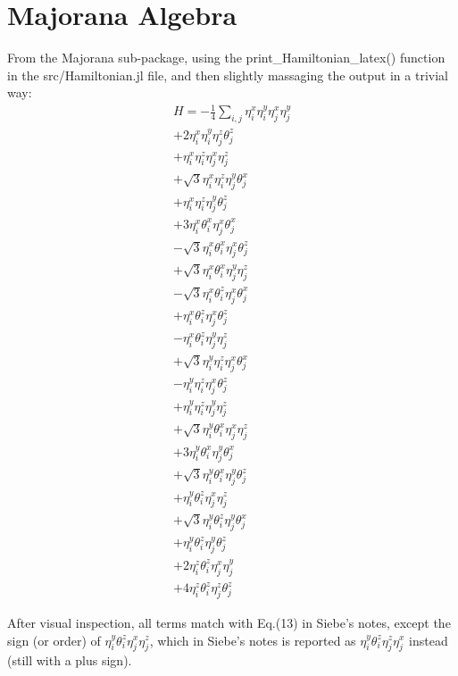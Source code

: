 \documentclass{article}
\begin{document}
\section{Majorana Algebra}
From the Majorana sub-package,
using the \textsf{print\_Hamiltonian\_latex()} function
in the \textsf{src/Hamiltonian.jl} file,
and then slightly massaging the output
in a trivial way:
\begin{equation}
  \begin{aligned}
    H = -\frac{1}{4} \sum_{i,j} \eta^x_i \eta^y_i \eta^x_j \eta^y_j  \\
+2 \eta^x_i \eta^y_i \eta^z_j \theta^z_j \\
+\eta^x_i \eta^z_i \eta^x_j \eta^z_j \\
+\sqrt{3} \eta^x_i \eta^z_i \eta^y_j \theta^x_j \\
+\eta^x_i \eta^z_i \eta^y_j \theta^z_j \\
+3 \eta^x_i \theta^x_i \eta^x_j \theta^x_j  \\
- \sqrt{3} \eta^x_i \theta^x_i \eta^x_j \theta^z_j \\
+\sqrt{3} \eta^x_i \theta^x_i \eta^y_j \eta^z_j \\
- \sqrt{3} \eta^x_i \theta^z_i \eta^x_j \theta^x_j \\
+\eta^x_i \theta^z_i \eta^x_j \theta^z_j \\
-\eta^x_i \theta^z_i \eta^y_j \eta^z_j \\
+\sqrt{3} \eta^y_i \eta^z_i \eta^x_j \theta^x_j  \\
- \eta^y_i \eta^z_i \eta^x_j \theta^z_j \\
+\eta^y_i \eta^z_i \eta^y_j \eta^z_j \\
+\sqrt{3} \eta^y_i \theta^x_i \eta^x_j \eta^z_j  \\
+3 \eta^y_i \theta^x_i \eta^y_j \theta^x_j \\
+\sqrt{3} \eta^y_i \theta^x_i \eta^y_j \theta^z_j  \\
+\eta^y_i \theta^z_i \eta^x_j \eta^z_j \\
+\sqrt{3} \eta^y_i \theta^z_i \eta^y_j \theta^x_j \\
+\eta^y_i \theta^z_i \eta^y_j \theta^z_j  \\
+2 \eta^z_i \theta^z_i \eta^x_j \eta^y_j \\
+4 \eta^z_i \theta^z_i \eta^z_j \theta^z_j
  \end{aligned}
\end{equation}

After visual inspection, all terms match with Eq.(13)
in Siebe's notes, except the sign (or order)
of $\eta^y_i \theta^z_i \eta^x_j \eta^z_j$,
which in Siebe's notes is reported as
$\eta^y_i \theta^z_i \eta^z_j \eta^x_j$
instead (still with a plus sign).
\end{document}
